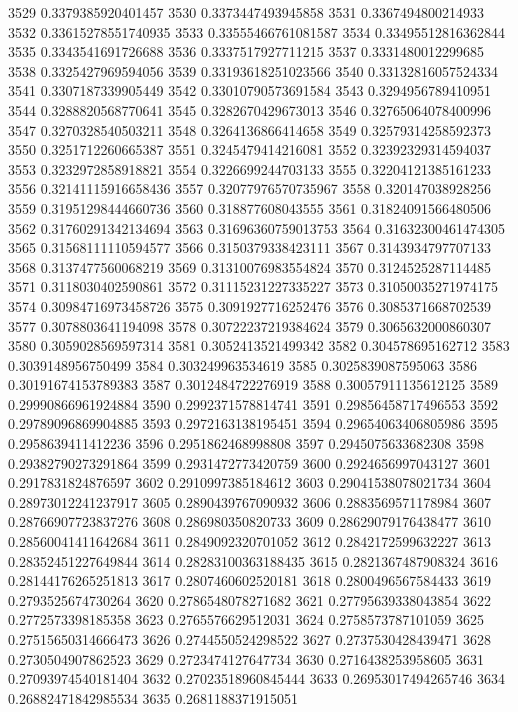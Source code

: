 3529 0.3379385920401457
3530 0.3373447493945858
3531 0.3367494800214933
3532 0.33615278551740935
3533 0.33555466761081587
3534 0.33495512816362844
3535 0.3343541691726688
3536 0.3337517927711215
3537 0.3331480012299685
3538 0.3325427969594056
3539 0.33193618251023566
3540 0.33132816057524334
3541 0.3307187339905449
3542 0.33010790573691584
3543 0.3294956789410951
3544 0.3288820568770641
3545 0.3282670429673013
3546 0.32765064078400996
3547 0.3270328540503211
3548 0.3264136866414658
3549 0.32579314258592373
3550 0.3251712260665387
3551 0.3245479414216081
3552 0.32392329314594037
3553 0.3232972858918821
3554 0.3226699244703133
3555 0.32204121385161233
3556 0.32141115916658436
3557 0.32077976570735967
3558 0.320147038928256
3559 0.31951298444660736
3560 0.318877608043555
3561 0.31824091566480506
3562 0.31760291342134694
3563 0.31696360759013753
3564 0.31632300461474305
3565 0.31568111110594577
3566 0.3150379338423111
3567 0.3143934797707133
3568 0.3137477560068219
3569 0.31310076983554824
3570 0.3124525287114485
3571 0.3118030402590861
3572 0.31115231227335227
3573 0.31050035271974175
3574 0.30984716973458726
3575 0.3091927716252476
3576 0.3085371668702539
3577 0.3078803641194098
3578 0.30722237219384624
3579 0.3065632000860307
3580 0.3059028569597314
3581 0.3052413521499342
3582 0.304578695162712
3583 0.3039148956750499
3584 0.303249963534619
3585 0.3025839087595063
3586 0.30191674153789383
3587 0.3012484722276919
3588 0.30057911135612125
3589 0.29990866961924884
3590 0.2992371578814741
3591 0.29856458717496553
3592 0.29789096869904885
3593 0.2972163138195451
3594 0.29654063406805986
3595 0.2958639411412236
3596 0.2951862468998808
3597 0.2945075633682308
3598 0.29382790273291864
3599 0.2931472773420759
3600 0.2924656997043127
3601 0.2917831824876597
3602 0.2910997385184612
3603 0.29041538078021734
3604 0.28973012241237917
3605 0.2890439767090932
3606 0.2883569571178984
3607 0.28766907723837276
3608 0.286980350820733
3609 0.28629079176438477
3610 0.28560041411642684
3611 0.2849092320701052
3612 0.2842172599632227
3613 0.28352451227649844
3614 0.28283100363188435
3615 0.2821367487908324
3616 0.28144176265251813
3617 0.2807460602520181
3618 0.2800496567584433
3619 0.2793525674730264
3620 0.2786548078271682
3621 0.27795639338043854
3622 0.2772573398185358
3623 0.2765576629512031
3624 0.2758573787101059
3625 0.27515650314666473
3626 0.2744550524298522
3627 0.2737530428439471
3628 0.2730504907862523
3629 0.2723474127647734
3630 0.2716438253958605
3631 0.27093974540181404
3632 0.27023518960845444
3633 0.26953017494265746
3634 0.26882471842985534
3635 0.2681188371915051
